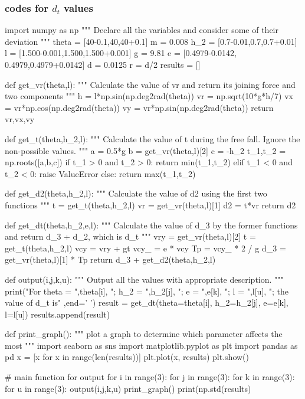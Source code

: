 \documentclass[conference]{IEEEtran}
\begin{document}
    \subsubsection{codes for $d_t$ values}
    \begin{python}
import numpy as np
"""
Declare all the variables
and consider some of their
deviation
"""
theta = [40-0.1,40,40+0.1] 
m = 0.008
h_2 = [0.7-0.01,0.7,0.7+0.01]
l = [1.500-0.001,1.500,1.500+0.001] 
g = 9.81
e = [0.4979-0.0142,
    0.4979,0.4979+0.0142] 
d = 0.0125
r = d/2
results = []

def get_vr(theta,l):
    """
    Calculate the value of vr and return
    its joining force and two components
    """
    h = l*np.sin(np.deg2rad(theta))
    vr = np.sqrt(10*g*h/7)
    vx = vr*np.cos(np.deg2rad(theta))
    vy = vr*np.sin(np.deg2rad(theta))
    return vr,vx,vy
    
def get_t(theta,h_2,l):
    """
    Calculate the value of t
    during the free fall.
    Ignore the non-possible values.
    """
    a = 0.5*g
    b = get_vr(theta,l)[2]
    c = -h_2
    t_1,t_2 = np.roots([a,b,c])
    if t_1 > 0 and t_2 > 0:
        return min(t_1,t_2)
    elif t_1 < 0 and t_2 < 0:
        raise ValueError
    else:
        return max(t_1,t_2)
        
def get_d2(theta,h_2,l):
    """
    Calculate the value of d2
    using the first two functions
    """
    t = get_t(theta,h_2,l)
    vr = get_vr(theta,l)[1]
    d2 = t*vr
    return d2
    
def get_dt(theta,h_2,e,l):
    """
    Calculate the value of d_3
    by the former functions and 
    return d_3 + d_2, which is 
    d_t
    """
    vry = get_vr(theta,l)[2]
    t = get_t(theta,h_2,l)
    vcy = vry + gt
    vcy_ = e * vcy
    Tp = vcy_ * 2 / g
    d_3 = get_vr(theta,l)[1] * Tp
    return d_3 + get_d2(theta,h_2,l)
    
def output(i,j,k,u):
    """
    Output all the values with
    appropriate description.
    """
    print("For theta = ",theta[i],
          "; h_2 = ",h_2[j],
          "; e = ",e[k],
          "; l = ",l[u],
          "; the value of d_t is"
          ,end=' ')
    result = get_dt(theta=theta[i],
                    h_2=h_2[j],
                    e=e[k],
                    l=l[u])
    results.append(result)

def print_graph():
    """
    plot a graph to determine which
    parameter affects the most
    """
    import seaborn as sns
    import matplotlib.pyplot as plt
    import pandas as pd
    x = [x for x in range(len(results))]
    plt.plot(x, results)
    plt.show()

# main function for output     
for i in range(3):
    for j in range(3):
        for k in range(3):
            for u in range(3):
                output(i,j,k,u)
print_graph()
print(np.std(results)

    \end{python}
\end{document}
